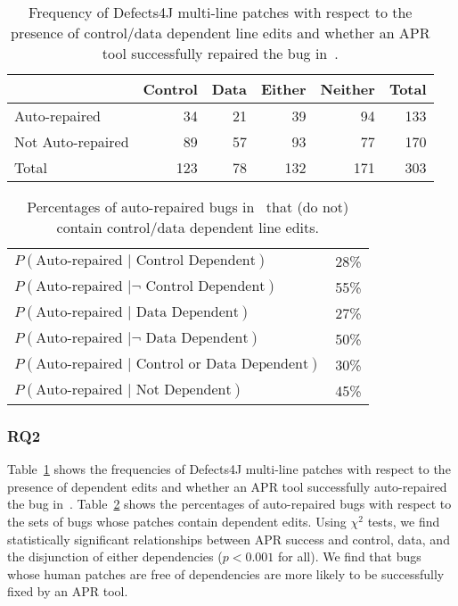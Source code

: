 \documentclass[sigconf, timestamp-false, anonymous=true]{acmart}
\begin{document}
\begin{table}
{\begin{center}
	\begin{tabular}{l | rrrr | r}
            	\toprule
            	& Control & Data & Either & Neither & Total \\
            	\midrule
            	Auto-repaired & 34 & 21 & 39 & 94 & 133 \\
            	Not Auto-repaired & 89 & 57 & 93 & 77 & 170 \\
            	\midrule
            	Total & 123 & 78 & 132 & 171 & 303 \\
            	\bottomrule
	\end{tabular}
 \end{center}
}
	\caption{Frequency of Defects4J multi-line patches with respect to the presence of 
	control/data dependent line edits and whether an APR tool successfully 
	repaired the bug in~\cite{durieux-repair-them-all}.}
	\label{tab:dependency-repair-contingency-table}
\end{table}

\begin{table}
{\begin{center}
	\begin{tabular}{l | r}
            	\toprule
		$P(\mbox{Auto-repaired } | \mbox{ Control Dependent})$ & 28\% \\
		$P(\mbox{Auto-repaired } | \neg \mbox{ Control Dependent})$ & 55\% \\
		$P(\mbox{Auto-repaired } | \mbox{ Data Dependent})$ & 27\% \\
		$P(\mbox{Auto-repaired } | \neg \mbox{ Data Dependent})$ & 50\% \\
		$P(\mbox{Auto-repaired } | \mbox{ Control or Data Dependent})$ & 30\% \\
		$P(\mbox{Auto-repaired } | \mbox{ Not Dependent})$ & 45\% \\
		\bottomrule
	\end{tabular}
 \end{center}
}
	\caption{Percentages of auto-repaired bugs in~\cite{durieux-repair-them-all} 
	that (do not) contain control/data dependent line edits.}
	\label{tab:dependency-repair-percents}
\end{table}

\subsubsection{RQ2} 

Table~\ref{tab:dependency-repair-contingency-table} shows
the frequencies of Defects4J multi-line patches with respect to the presence of 
dependent edits and whether an APR tool successfully auto-repaired the bug in~\cite{durieux-repair-them-all}.
Table~\ref{tab:dependency-repair-percents} shows the percentages of 
auto-repaired bugs with respect to the sets of bugs whose patches contain 
dependent edits.
Using $\chi^2$ tests, we find statistically significant relationships between APR  
success and control, data, and the disjunction of either dependencies 
($p < 0.001$ for all).
We find that bugs whose human patches are free of dependencies are
more likely to be successfully fixed by an APR tool.
\end{document}
